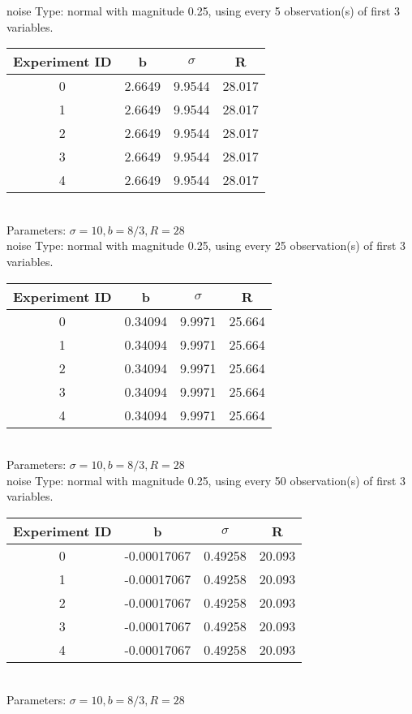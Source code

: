 \begin{multicols}{3}
noise Type: normal with magnitude 0.25, using every 5 observation(s) of first 3 variables.\\
\begin{tabular}{cccc}
\hline Experiment ID & b & $\sigma$ & R \\ \hline 
0 & 2.6649 & 9.9544 & 28.017\\ \hline 
 1 & 2.6649 & 9.9544 & 28.017\\ \hline 
 2 & 2.6649 & 9.9544 & 28.017\\ \hline 
 3 & 2.6649 & 9.9544 & 28.017\\ \hline 
 4 & 2.6649 & 9.9544 & 28.017\\ \hline 
 \end{tabular}\\
Parameters: $\sigma=10, b=8/3, R=28$\\
noise Type: normal with magnitude 0.25, using every 25 observation(s) of first 3 variables.\\
\begin{tabular}{cccc}
\hline Experiment ID & b & $\sigma$ & R \\ \hline 
0 & 0.34094 & 9.9971 & 25.664\\ \hline 
 1 & 0.34094 & 9.9971 & 25.664\\ \hline 
 2 & 0.34094 & 9.9971 & 25.664\\ \hline 
 3 & 0.34094 & 9.9971 & 25.664\\ \hline 
 4 & 0.34094 & 9.9971 & 25.664\\ \hline 
 \end{tabular}\\
Parameters: $\sigma=10, b=8/3, R=28$\\
noise Type: normal with magnitude 0.25, using every 50 observation(s) of first 3 variables.\\
\begin{tabular}{cccc}
\hline Experiment ID & b & $\sigma$ & R \\ \hline 
0 & -0.00017067 & 0.49258 & 20.093\\ \hline 
 1 & -0.00017067 & 0.49258 & 20.093\\ \hline 
 2 & -0.00017067 & 0.49258 & 20.093\\ \hline 
 3 & -0.00017067 & 0.49258 & 20.093\\ \hline 
 4 & -0.00017067 & 0.49258 & 20.093\\ \hline 
 \end{tabular}\\
Parameters: $\sigma=10, b=8/3, R=28$\\

\end{multicols}
